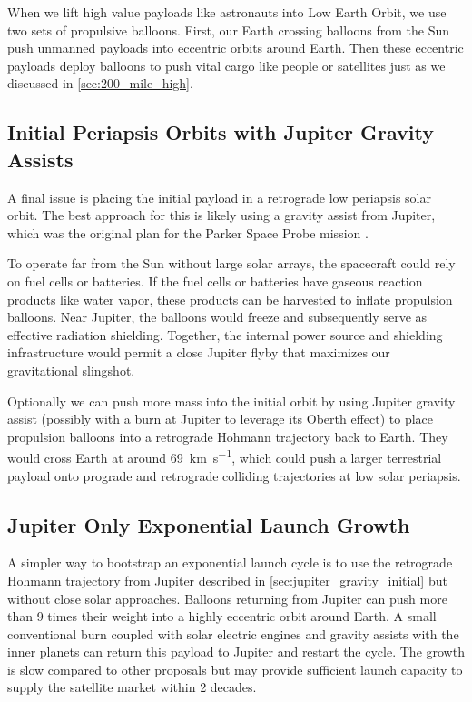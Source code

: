 \documentclass{article}
\begin{document}
{When we lift high value payloads like astronauts into Low Earth Orbit, we use two sets of propulsive balloons. First, our Earth crossing balloons from the Sun push unmanned payloads into eccentric orbits around Earth. Then these eccentric payloads deploy balloons to push vital cargo like people or  satellites just as we discussed in \autoref{sec:200_mile_high}.

\subsection{Initial Periapsis Orbits with Jupiter Gravity Assists} \label{sec:jupiter_gravity_initial}
A final issue is placing the initial payload in a retrograde low periapsis solar orbit.  The best approach for this is likely using a gravity assist from Jupiter, which was the original plan for the Parker Space Probe mission \cite{mccomas2005solar}. 

To operate far from the Sun without large solar arrays, the spacecraft could rely on fuel cells or batteries. If the fuel cells or batteries have gaseous reaction products like water vapor, these products can be harvested to inflate propulsion balloons. Near Jupiter, the balloons would freeze and subsequently serve as effective radiation shielding. Together, the internal power source and shielding infrastructure would permit a close Jupiter flyby that maximizes our gravitational slingshot.

Optionally we can push more mass into the initial orbit by using Jupiter gravity assist (possibly with a burn at Jupiter to leverage its Oberth effect) to place propulsion balloons into a retrograde Hohmann trajectory back to Earth.   They would cross Earth at around \SI{69}{\kilo\meter\per\second}, which could push a larger terrestrial payload onto  prograde and retrograde colliding trajectories at low solar periapsis.

\subsection{Jupiter Only Exponential Launch Growth}\label{sec:jupiter_only_growth}
A simpler way to bootstrap an exponential launch cycle is to use the retrograde Hohmann trajectory from Jupiter described in \autoref{sec:jupiter_gravity_initial} but without close solar approaches.   Balloons returning from Jupiter can push more than 9 times their weight into a highly eccentric orbit around Earth.   A small conventional burn coupled with solar electric engines and gravity assists with the inner planets can return this payload to Jupiter and restart the cycle.     The growth is slow compared to other proposals but may provide sufficient launch capacity to supply the satellite market within 2 decades.

}
\end{document}
